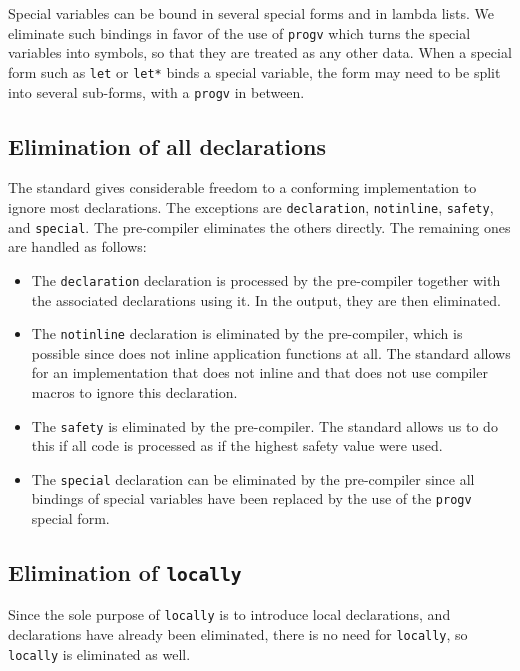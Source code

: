 Special variables can be bound in several special forms and in lambda
lists.  We eliminate such bindings in favor of the use of
\texttt{progv} which turns the special variables into symbols, so that
they are treated as any other data.  When a special form such as
\texttt{let} or \texttt{let*} binds a special variable, the form may
need to be split into several sub-forms, with a \texttt{progv} in
between.

\subsection{Elimination of all declarations}

The \commonlisp{} standard gives considerable freedom to a conforming
implementation to ignore most declarations.  The exceptions are
\texttt{declaration}, \texttt{notinline}, \texttt{safety}, and
\texttt{special}.  The pre-compiler eliminates the others directly.
The remaining ones are handled as follows:

\begin{itemize}
\item The \texttt{declaration} declaration is processed by the
  pre-compiler together with the associated declarations using it.
  In the output, they are then eliminated.
\item The \texttt{notinline} declaration is eliminated by the
  pre-compiler, which is possible since \sysname{} does not inline
  application functions at all.  The standard allows for an
  implementation that does not inline and that does not use compiler
  macros to ignore this declaration.
\item The \texttt{safety} is eliminated by the pre-compiler.  The
  standard allows us to do this if all code is processed as if the
  highest safety value were used.
\item The \texttt{special} declaration can be eliminated by the
  pre-compiler since all bindings of special variables have been
  replaced by the use of the \texttt{progv} special form. 
\end{itemize}

\subsection{Elimination of \texttt{locally}}

Since the sole purpose of \texttt{locally} is to introduce local
declarations, and declarations have already been eliminated, there is
no need for \texttt{locally}, so \texttt{locally} is eliminated as well.

